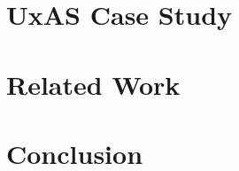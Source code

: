 \documentclass[global,twocolumn]{svjour}
\begin{document}
\section{UxAS Case Study} \label{sec:case-study}


\section{Related Work} \label{sec:related-work}


\section{Conclusion} \label{sec:conclusion}


\clearpage



%  

% 
\end{document}
